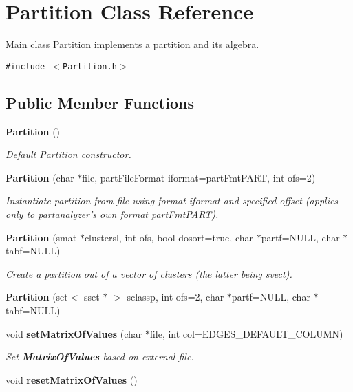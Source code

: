 \section{Partition Class Reference}
\label{classPartition}
Main class Partition implements a partition and its algebra.  


{\tt \#include $<$Partition.h$>$}

\subsection*{Public Member Functions}
\begin{CompactItemize}
\item 
{\bf Partition} ()
\begin{CompactList}\small\item\em Default Partition constructor. \item\end{CompactList}\item 
{\bf Partition} (char $\ast$file, part\-File\-Format iformat=part\-Fmt\-PART, int ofs=2)\label{classPartition_a1}

\begin{CompactList}\small\item\em Instantiate partition from file using format iformat and specified offset (applies only to partanalyzer's own format part\-Fmt\-PART). \item\end{CompactList}\item 
{\bf Partition} (smat $\ast$clustersl, int ofs, bool dosort=true, char $\ast$partf=NULL, char $\ast$tabf=NULL)\label{classPartition_a2}

\begin{CompactList}\small\item\em Create a partition out of a vector of clusters (the latter being svect). \item\end{CompactList}\item 
{\bf Partition} (set$<$ sset $\ast$ $>$ sclassp, int ofs=2, char $\ast$partf=NULL, char $\ast$tabf=NULL)
\item 
void {\bf set\-Matrix\-Of\-Values} (char $\ast$file, int col=EDGES\_\-DEFAULT\_\-COLUMN)\label{classPartition_a4}

\begin{CompactList}\small\item\em Set {\bf Matrix\-Of\-Values} based on external file. \item\end{CompactList}\item 
void {\bf reset\-Matrix\-Of\-Values} ()\label{classPartition_a5}


\end{CompactItemize}
